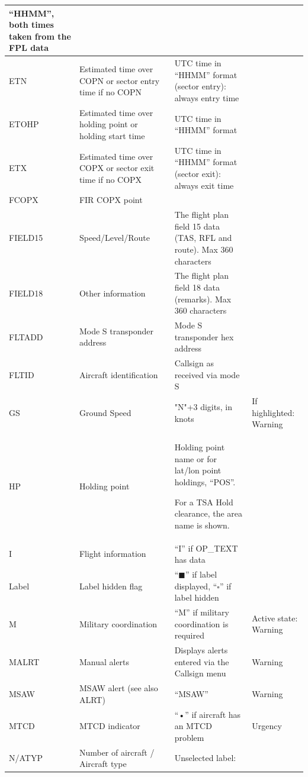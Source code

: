 \documentclass[11pt,a4paper,oldfontcommands]{memoir}
\begin{document}
\begin{landscape}
\begin{longtable}{|p{3cm}|p{4cm}|p{8cm}|p{6cm}|}
      “HHMM”, both times taken from  the FPL data &
       \\ \hline
    ETN &
      Estimated time over  COPN or sector entry  time if no COPN &
      UTC time in “HHMM” format (sector entry): always entry time &
       \\ \hline
    ETOHP &
      Estimated time over  holding point or holding  start time &
      UTC time in “HHMM” format &
       \\ \hline
    ETX &
      Estimated time over  COPX or sector exit time  if no COPX &
      UTC time in “HHMM” format (sector exit): always exit time &
       \\ \hline
    FCOPX &
      FIR COPX point &
       &
       \\ \hline
    FIELD15 &
      Speed/Level/Route &
      The flight plan field 15 data (TAS,  RFL and route). Max 360 characters &
       \\ \hline
    FIELD18 &
      Other information &
      The flight plan field 18 data  (remarks). Max 360 characters &
       \\ \hline
    FLTADD &
      Mode S transponder  address &
      Mode S transponder hex address &
       \\ \hline
    FLTID &
      Aircraft identification &
      Callsign as received via mode S &
       \\ \hline
    GS &
      Ground Speed &
      "N"+3 digits, in knots &
      If highlighted: Warning \\ \hline
    HP &
      Holding point &
      Holding point name or for lat/lon  point holdings, “POS”. 
      
      For a TSA Hold clearance, the area  name is shown. &
       \\ \hline
    I &
      Flight information &
      “I” if OP\_TEXT has data &
       \\ \hline
    Label &
      Label hidden flag &
      “$\blacksquare$” if label displayed, “$\square$” if label hidden &
       \\ \hline
    M &
      Military coordination &
      “M” if military coordination is  required &
      Active state: Warning \\ \hline
    MALRT &
      Manual alerts &
      Displays alerts entered via the  Callsign menu &
      Warning \\ \hline
    MSAW &
      MSAW alert (see also ALRT) &
      “MSAW” &
      Warning \\ \hline
    MTCD &
      MTCD indicator &
      “•” if aircraft has an MTCD problem &
      Urgency \\ \hline
    N/ATYP &
      Number of aircraft /  Aircraft type &
      Unselected label: 
      

\end{longtable}
\end{landscape}
\end{document}
